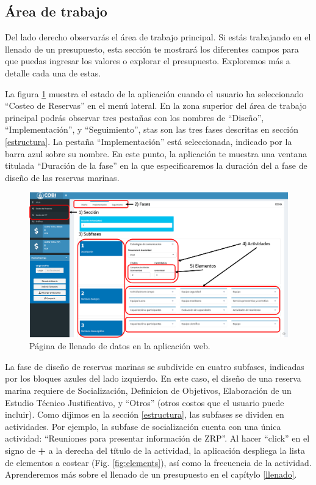 \documentclass[
]{book}
\begin{document}
\hypertarget{uxe1rea-de-trabajo}{%
\subsection{Área de trabajo}\label{uxe1rea-de-trabajo}}

Del lado derecho observarás el área de trabajo principal. Si estás trabajando en el llenado de un presupuesto, esta sección te mostrará los diferentes campos para que puedas ingresar los valores o explorar el presupuesto. Exploremos más a detalle cada una de estas.

La figura \ref{fig:filling-page} muestra el estado de la aplicación cuando el usuario ha seleccionado ``Costeo de Reservas'' en el menú lateral. En la zona superior del área de trabajo principal podrás observar tres pestañas con los nombres de ``Diseño'', ``Implementación'', y ``Seguimiento'', stas son las tres fases descritas en sección \ref{estructura}. La pestaña ``Implementación'' está seleccionada, indicado por la barra azul sobre su nombre. En este punto, la aplicación te muestra una ventana titulada ``Duración de la fase'' en la que especificaremos la duración del a fase de diseño de las reservas marinas.

\begin{figure}
\centering
\includegraphics{images/jerarquia.png}
\caption{\label{fig:filling-page}Página de llenado de datos en la aplicación web.}
\end{figure}

La fase de diseño de reservas marinas se subdivide en cuatro subfases, indicadas por los bloques azules del lado izquierdo. En este caso, el diseño de una reserva marina requiere de Socialización, Definicion de Objetivos, Elaboración de un Estudio Técnico Justificativo, y ``Otros'' (otros costos que el usuario puede incluir). Como dijimos en la sección \ref{estructura}, las subfases se dividen en actividades. Por ejemplo, la subfase de socialización cuenta con una única actividad: ``Reuniones para presentar información de ZRP''. Al hacer ``click'' en el signo de \textbf{+} a la derecha del título de la actividad, la aplicación despliega la lista de elementos a costear (Fig. \ref{fig:elements}), así como la frecuencia de la actividad. Aprenderemos más sobre el llenado de un presupuesto en el capítylo \ref{llenado}.
\end{document}
